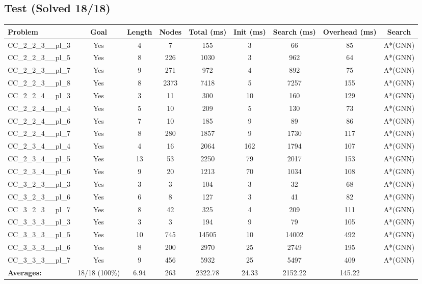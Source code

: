 \documentclass{article}
\begin{document}
\subsection*{Test (Solved 18/18)}
\begin{tabular}{lcccccccc}
\toprule
Problem & Goal & Length & Nodes & Total (ms) & Init (ms) & Search (ms) & Overhead (ms) & Search \\
\midrule
CC\_2\_2\_3\_\_pl\_3 & Yes & 4 & 7 & 155 & 3 & 66 & 85 & A*(GNN) \\
CC\_2\_2\_3\_\_pl\_5 & Yes & 8 & 226 & 1030 & 3 & 962 & 64 & A*(GNN) \\
CC\_2\_2\_3\_\_pl\_7 & Yes & 9 & 271 & 972 & 4 & 892 & 75 & A*(GNN) \\
CC\_2\_2\_3\_\_pl\_8 & Yes & 8 & 2373 & 7418 & 5 & 7257 & 155 & A*(GNN) \\
CC\_2\_2\_4\_\_pl\_3 & Yes & 3 & 11 & 300 & 10 & 160 & 129 & A*(GNN) \\
CC\_2\_2\_4\_\_pl\_4 & Yes & 5 & 10 & 209 & 5 & 130 & 73 & A*(GNN) \\
CC\_2\_2\_4\_\_pl\_6 & Yes & 7 & 10 & 185 & 9 & 89 & 86 & A*(GNN) \\
CC\_2\_2\_4\_\_pl\_7 & Yes & 8 & 280 & 1857 & 9 & 1730 & 117 & A*(GNN) \\
CC\_2\_3\_4\_\_pl\_4 & Yes & 4 & 16 & 2064 & 162 & 1794 & 107 & A*(GNN) \\
CC\_2\_3\_4\_\_pl\_5 & Yes & 13 & 53 & 2250 & 79 & 2017 & 153 & A*(GNN) \\
CC\_2\_3\_4\_\_pl\_6 & Yes & 9 & 20 & 1213 & 70 & 1034 & 108 & A*(GNN) \\
CC\_3\_2\_3\_\_pl\_3 & Yes & 3 & 3 & 104 & 3 & 32 & 68 & A*(GNN) \\
CC\_3\_2\_3\_\_pl\_6 & Yes & 6 & 8 & 127 & 3 & 41 & 82 & A*(GNN) \\
CC\_3\_2\_3\_\_pl\_7 & Yes & 8 & 42 & 325 & 4 & 209 & 111 & A*(GNN) \\
CC\_3\_3\_3\_\_pl\_3 & Yes & 3 & 3 & 194 & 9 & 79 & 105 & A*(GNN) \\
CC\_3\_3\_3\_\_pl\_5 & Yes & 10 & 745 & 14505 & 10 & 14002 & 492 & A*(GNN) \\
CC\_3\_3\_3\_\_pl\_6 & Yes & 8 & 200 & 2970 & 25 & 2749 & 195 & A*(GNN) \\
CC\_3\_3\_3\_\_pl\_7 & Yes & 9 & 456 & 5932 & 25 & 5497 & 409 & A*(GNN) \\
\textbf{Averages:} & 18/18 (100\%) & 6.94 & 263 & 2322.78 & 24.33 & 2152.22 & 145.22 & \\
\bottomrule
\end{tabular}
\\[0.7cm]
\end{document}
